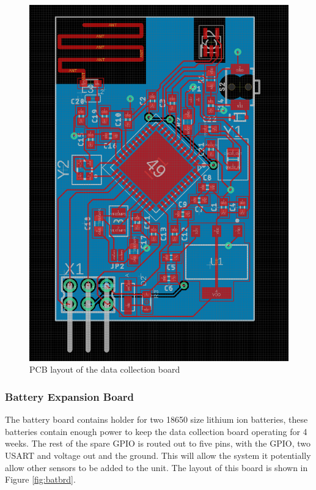 \documentclass[12pt]{article}
\begin{document}
\begin{figure}[H]
\includegraphics[width=\textwidth]{ZigBee-Board}
\caption{PCB layout of the data collection board}
\label{fig:mainbrd}
\end{figure}

\subsubsection{Battery Expansion Board}
The battery board contains holder for two 18650 size lithium ion batteries, these batteries
contain enough power to keep the data collection board operating for 4 weeks. The rest of the
spare GPIO is routed out to five pins, with the GPIO, two USART and voltage out and the ground.
This will allow the system it potentially allow other sensors to be added to the unit. The layout
of this board is shown in Figure {\ref{fig:batbrd}}.
\end{document}
